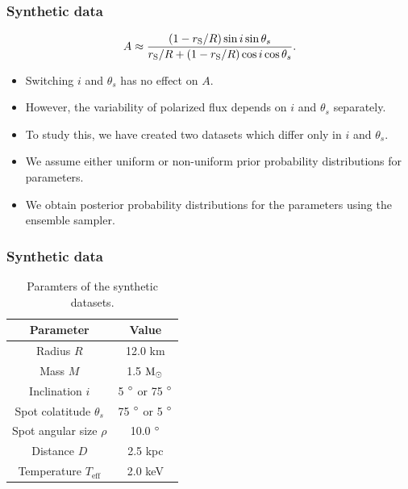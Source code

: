 \documentclass{beamer}
\def\rg{r_{\rm S}} %
\def\be{\begin{equation}}
\def\ee{\end{equation}}
\def\msun{{\rm M_{\odot}}}
\def\rg{r_{\rm S}} %
\def\thetas{\theta_{s}}
\begin{document}
\begin{frame}
\frametitle{Synthetic data}


\be \label{eq:amplitude_incthet}
A \approx \frac{(1-\rg/R)\sin i \sin \thetas}{\rg/R+(1-\rg/R)\cos i \cos \thetas}.
\ee 
\begin{itemize}
\item Switching $i$ and $\thetas$ has no effect on $A$.
\item However, the variability of polarized flux depends on $i$ and $\thetas$ separately.
\item To study this, we have created two datasets which differ only in $i$ and $\thetas$.
\item We assume either uniform or non-uniform prior probability distributions for parameters.
\item We obtain posterior probability distributions for the parameters using the ensemble sampler.


\end{itemize}


\end{frame}




\begin{frame}

\begin{center}
\frametitle{Synthetic data}
\begin{table}
  \caption{Paramters of the synthetic datasets.}
\label{table:params}
\begin{center}
  \begin{tabular}{| c | c |}
    \hline
     Parameter & Value\\ \hline
      Radius $R$ & 12.0 km  \\ \hline
      Mass $M$ & 1.5 $\msun$  \\ \hline
      Inclination $i$ & 5 $\degree$ or 75 $\degree$ \\ \hline
      Spot colatitude $\thetas$ & 75 $\degree$ or 5 $\degree$ \\ \hline
      Spot angular size $\rho$ & 10.0 $\degree$  \\ \hline
      Distance $D$ & 2.5 kpc \\ \hline
      Temperature $T_{\mathrm{eff}}$ & 2.0 keV \\

    \hline
  \end{tabular}
  \end{center} 

  \end{table}
\end{center}

\end{frame}
\end{document}
